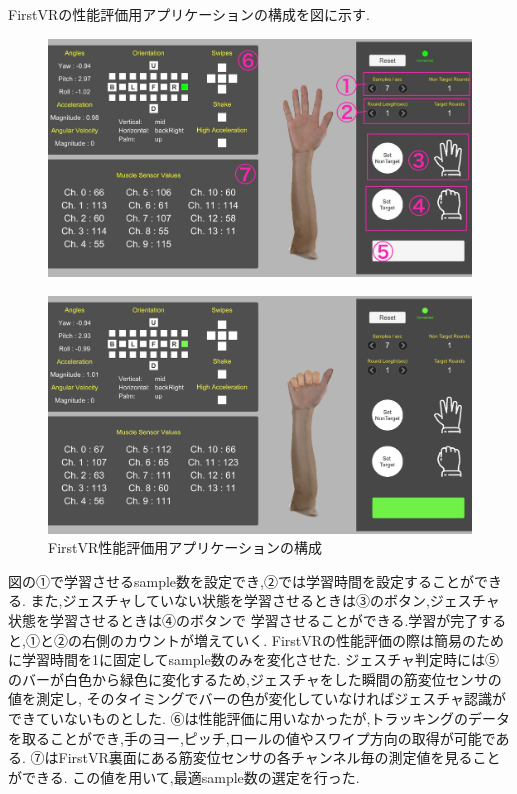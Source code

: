 \documentclass{ltjsreport}
\begin{document}
\clearpage

		FirstVRの性能評価用アプリケーションの構成を図に示す.
		\begin{figure}[H]
		\centering
		\begin{minipage}{0.7\columnwidth}
		\centering
		\includegraphics[width = \columnwidth]{../figs/IMG_0345.JPG}
		\label{fig:FVRnocalibration}
		\end{minipage}
		\hspace{0.04\columnwidth}
		\begin{minipage}{0.7\columnwidth}
		\centering
		\includegraphics[width = \columnwidth]{../figs/IMG_1867.PNG}
		\end{minipage}
		\caption{FirstVR性能評価用アプリケーションの構成}
		\label{fig:FirstVRapplication}
		\end{figure}
		\vspace{-15pt}
		図の①で学習させるsample数を設定でき,②では学習時間を設定することができる.
		また,ジェスチャしていない状態を学習させるときは③のボタン,ジェスチャ状態を学習させるときは④のボタンで
		学習させることができる.学習が完了すると,①と②の右側のカウントが増えていく.
		FirstVRの性能評価の際は簡易のために学習時間を1に固定してsample数のみを変化させた.
		ジェスチャ判定時には⑤のバーが白色から緑色に変化するため,ジェスチャをした瞬間の筋変位センサの値を測定し,
		そのタイミングでバーの色が変化していなければジェスチャ認識ができていないものとした.
		⑥は性能評価に用いなかったが,トラッキングのデータを取ることができ,手のヨー,ピッチ,ロールの値やスワイプ方向の取得が可能である.
		⑦はFirstVR裏面にある筋変位センサの各チャンネル毎の測定値を見ることができる.
		この値を用いて,最適sample数の選定を行った.
\end{document}
